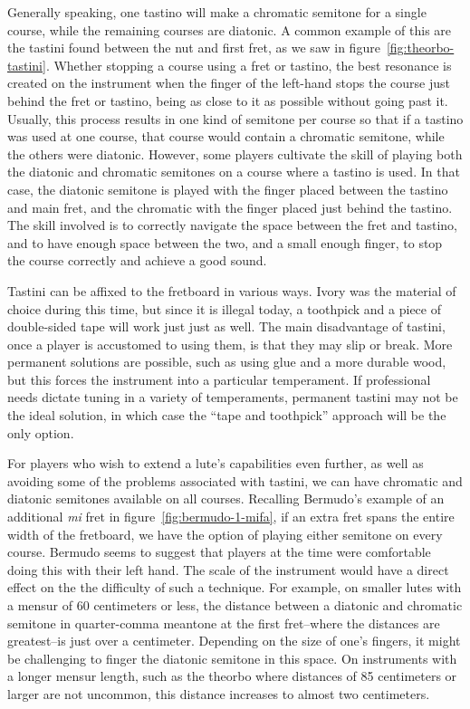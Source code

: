 Generally speaking, one tastino will make a chromatic semitone for a single course, while the
remaining courses are diatonic.  A common example of this are the tastini found between the nut and
first fret, as we saw in figure~\ref{fig:theorbo-tastini}. Whether stopping a course using a fret or
tastino, the best resonance is created on the instrument when the finger of the left-hand stops the
course just behind the fret or tastino, being as close to it as possible without going past it.
Usually, this process results in one kind of semitone per course so that if a tastino was used at
one course, that course would contain a chromatic semitone, while the others were diatonic.
However, some players cultivate the skill of playing both the diatonic and chromatic semitones on a
course where a tastino is used. In that case, the diatonic semitone is played with the finger placed
between the tastino and main fret, and the chromatic with the finger placed just behind the
tastino.  The skill involved is to correctly navigate the space between the fret and tastino, and to
have enough space between the two, and a small enough finger, to stop the course correctly and
achieve a good sound.

Tastini can be affixed to the fretboard in various ways. Ivory was the material of choice during
this time, but since it is illegal today, a toothpick and a piece of double-sided tape  will work
just just as well.  The main disadvantage of tastini, once a player is accustomed to using them, is
that they may slip or break.  More permanent solutions are possible, such as using glue and a more
durable wood, but this forces the instrument into a particular temperament.  If professional needs
dictate tuning in a variety of temperaments, permanent tastini may not be the ideal solution, in
which case the ``tape and toothpick'' approach will be the only option.

For players who wish to extend a lute's capabilities even further, as well as avoiding
some of the problems associated with tastini, we can have chromatic and diatonic
semitones available on all courses. Recalling Bermudo's example of an additional
\textit{mi} fret in figure~\ref{fig:bermudo-1-mifa}, if an extra fret spans the entire
width of the fretboard, we have the option of playing either semitone on every course.
Bermudo seems to suggest that players at the time were comfortable doing this with their left
hand.  The scale of the instrument would have a direct effect on the the difficulty of
such a technique.  For example, on smaller lutes with a mensur of 60 centimeters or
less, the distance between a diatonic and chromatic semitone in quarter-comma meantone
at the first fret--where the distances are greatest--is just over a centimeter.
Depending on the size of one's fingers, it might be challenging to finger the diatonic
semitone in this space.  On instruments with a longer mensur length, such as the
theorbo where distances of 85 centimeters or larger are not uncommon, this distance
increases to almost two centimeters.

